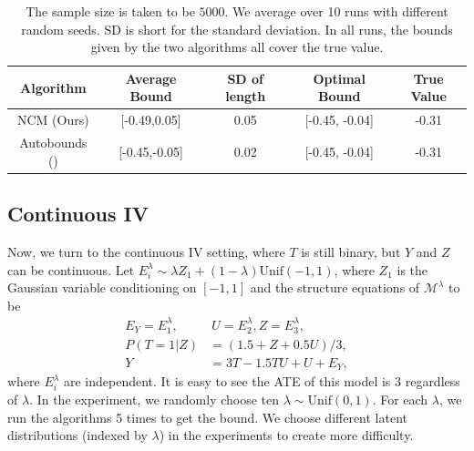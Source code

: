 \documentclass[12pt]{article}
\theoremstyle{plain}
\theoremstyle{definition}
\theoremstyle{remark}
\begin{document}
\begin{table}[!htb]
\centering
\begin{tabular}{|c|c|c|c|c|}
\hline
Algorithm & Average Bound & SD of length & Optimal Bound & True Value\\
\hline 
NCM (Ours)  & [-0.49,0.05] & 0.05 & [-0.45, -0.04] & -0.31\\
\hline 
Autobounds (\cite{duarteAutomatedApproachCausal2021}) & [-0.45,-0.05] & 0.02 &  [-0.45, -0.04] & -0.31 \\
\hline
\end{tabular}
\caption{ The sample size is taken to be $5000$. We average over 10 runs with different random seeds. SD is short for the standard deviation. In all runs, the bounds given by the two algorithms all cover the true value.}
\label{table:binary_iv}
\end{table}

\subsection{Continuous IV}
Now, we turn to the continuous IV setting, where $ T$ is still binary, but $Y$ and $Z$ can be continuous. Let $ E^\lambda_i \sim \lambda Z_1 + (1-\lambda) \text{Unif}(-1,1) $, where $ Z_1$ is the Gaussian variable conditioning on $[-1,1]$ and the structure equations of $\mathcal{M}^\lambda$ to be
\begin{align*}
    E_Y = E^\lambda_1, &\  U = E^\lambda_2, Z= E^\lambda_3, \\
    P(T=1|Z) &= (1.5 + Z + 0.5 U)/3 ,\\  Y &= 3T - 1.5TU + U + E_Y,
\end{align*}
where $E^\lambda_i$ are independent. It is easy to see the ATE of this model is $3$ regardless of $\lambda$. In the experiment, we randomly choose ten $\lambda \sim \text{Unif}(0,1)$. For each $\lambda$, we run the algorithms 5 times to get the bound. We choose different latent distributions (indexed by $\lambda$) in the experiments to create more difficulty. \par
\end{document}
